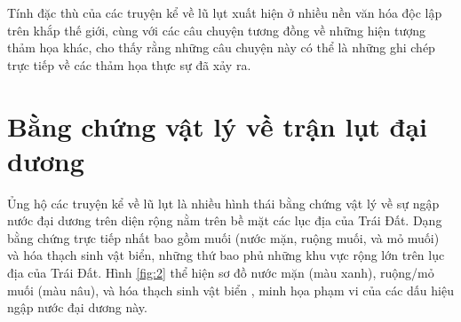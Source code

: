 \documentclass[10pt,twocolumn,letterpaper]{article}
\begin{document}
Tính đặc thù của các truyện kể về lũ lụt xuất hiện ở nhiều nền văn hóa độc lập trên khắp thế giới, cùng với các câu chuyện tương đồng về những hiện tượng thảm họa khác, cho thấy rằng những câu chuyện này có thể là những ghi chép trực tiếp về các thảm họa thực sự đã xảy ra.

\section{Bằng chứng vật lý về trận lụt đại dương}

Ủng hộ các truyện kể về lũ lụt là nhiều hình thái bằng chứng vật lý về sự ngập nước đại dương trên diện rộng nằm trên bề mặt các lục địa của Trái Đất. Dạng bằng chứng trực tiếp nhất bao gồm muối (nước mặn, ruộng muối, và mỏ muối) và hóa thạch sinh vật biển, những thứ bao phủ những khu vực rộng lớn trên lục địa của Trái Đất. Hình \ref{fig:2} thể hiện sơ đồ nước mặn (màu xanh), ruộng/mỏ muối (màu nâu), và hóa thạch sinh vật biển \cite{15,16,86,87}, minh họa phạm vi của các dấu hiệu ngập nước đại dương này.
\end{document}
